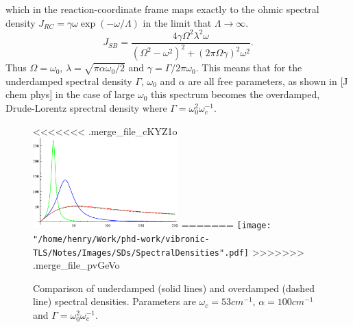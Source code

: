 \documentclass[]{article}
\begin{document}
\begin{itemize}
\begin{itemize}
which in the reaction-coordinate frame maps exactly to the ohmic spectral density $J_{RC} = \gamma \omega \exp(-\omega/\Lambda)$ in the limit that $\Lambda\to\infty$.
\begin{equation}
\label{eq:DrudeLorentzUnderdamped1}
J_{SB}  = \frac{4\gamma\Omega^2\lambda^2\omega}{(\Omega^2-\omega^2)^2 + (2\pi\Omega\gamma)^2\omega^2}.
\end{equation}
Thus $\Omega = \omega_0$, $\lambda=\sqrt{\pi \alpha \omega_0/2}$ and $\gamma=\Gamma/2\pi\omega_0$. This means that for the underdamped spectral density $\Gamma$, $\omega_0$ and $\alpha$ are all free parameters, as shown in [J chem phys] in the case of large $\omega_0$ this spectrum becomes the overdamped, Drude-Lorentz sprectral density where $\Gamma=\omega_0^2\omega_c^{-1}$.

\begin{figure}
<<<<<<< .merge_file_cKYZ1o
	\includegraphics[width=0.5\textwidth]{Images/SDs/SpectralDensities.pdf}
=======
	\texttt{[image: "/home/henry/Work/phd-work/vibronic-TLS/Notes/Images/SDs/SpectralDensities".pdf]}
>>>>>>> .merge_file_pvGeVo
	\caption{Comparison of underdamped (solid lines) and overdamped (dashed line) spectral densities. Parameters are $\omega_c=53cm^{-1}$, $\alpha=100cm^{-1}$ and $\Gamma=\omega_0^2\omega_c^{-1}$.}
\end{figure}

\end{itemize}
\end{itemize}
\end{document}
